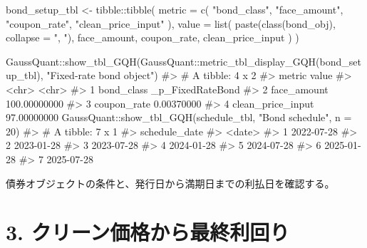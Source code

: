 \documentclass[
  letterpaper,
  DIV=11,
  numbers=noendperiod]{scrreprt}
\newenvironment{Shaded}{\begin{snugshade}}{\end{snugshade}}
\newcommand{\AttributeTok}[1]{\textcolor[rgb]{0.40,0.45,0.13}{#1}}
\newcommand{\CommentTok}[1]{\textcolor[rgb]{0.37,0.37,0.37}{#1}}
\newcommand{\DecValTok}[1]{\textcolor[rgb]{0.68,0.00,0.00}{#1}}
\newcommand{\FunctionTok}[1]{\textcolor[rgb]{0.28,0.35,0.67}{#1}}
\newcommand{\NormalTok}[1]{\textcolor[rgb]{0.00,0.23,0.31}{#1}}
\newcommand{\OtherTok}[1]{\textcolor[rgb]{0.00,0.23,0.31}{#1}}
\newcommand{\SpecialCharTok}[1]{\textcolor[rgb]{0.37,0.37,0.37}{#1}}
\newcommand{\StringTok}[1]{\textcolor[rgb]{0.13,0.47,0.30}{#1}}
\begin{document}
\begin{Shaded}
\begin{Highlighting}[]
\NormalTok{bond\_setup\_tbl }\OtherTok{\textless{}{-}}\NormalTok{ tibble}\SpecialCharTok{::}\FunctionTok{tibble}\NormalTok{(}
  \AttributeTok{metric =} \FunctionTok{c}\NormalTok{(}
    \StringTok{"bond\_class"}\NormalTok{,}
    \StringTok{"face\_amount"}\NormalTok{,}
    \StringTok{"coupon\_rate"}\NormalTok{,}
    \StringTok{"clean\_price\_input"}
\NormalTok{  ),}
  \AttributeTok{value =} \FunctionTok{list}\NormalTok{(}
    \FunctionTok{paste}\NormalTok{(}\FunctionTok{class}\NormalTok{(bond\_obj), }\AttributeTok{collapse =} \StringTok{", "}\NormalTok{),}
\NormalTok{    face\_amount,}
\NormalTok{    coupon\_rate,}
\NormalTok{    clean\_price\_input}
\NormalTok{  )}
\NormalTok{)}

\NormalTok{GaussQuant}\SpecialCharTok{::}\FunctionTok{show\_tbl\_GQH}\NormalTok{(GaussQuant}\SpecialCharTok{::}\FunctionTok{metric\_tbl\_display\_GQH}\NormalTok{(bond\_setup\_tbl), }\StringTok{"Fixed{-}rate bond object"}\NormalTok{)}
\CommentTok{\#\textgreater{} \# A tibble: 4 x 2}
\CommentTok{\#\textgreater{}   metric            value           }
\CommentTok{\#\textgreater{}   \textless{}chr\textgreater{}             \textless{}chr\textgreater{}           }
\CommentTok{\#\textgreater{} 1 bond\_class        \_p\_FixedRateBond}
\CommentTok{\#\textgreater{} 2 face\_amount       100.00000000    }
\CommentTok{\#\textgreater{} 3 coupon\_rate       0.00370000      }
\CommentTok{\#\textgreater{} 4 clean\_price\_input 97.00000000}
\NormalTok{GaussQuant}\SpecialCharTok{::}\FunctionTok{show\_tbl\_GQH}\NormalTok{(schedule\_tbl, }\StringTok{"Bond schedule"}\NormalTok{, }\AttributeTok{n =} \DecValTok{20}\NormalTok{)}
\CommentTok{\#\textgreater{} \# A tibble: 7 x 1}
\CommentTok{\#\textgreater{}   schedule\_date}
\CommentTok{\#\textgreater{}   \textless{}date\textgreater{}       }
\CommentTok{\#\textgreater{} 1 2022{-}07{-}28   }
\CommentTok{\#\textgreater{} 2 2023{-}01{-}28   }
\CommentTok{\#\textgreater{} 3 2023{-}07{-}28   }
\CommentTok{\#\textgreater{} 4 2024{-}01{-}28   }
\CommentTok{\#\textgreater{} 5 2024{-}07{-}28   }
\CommentTok{\#\textgreater{} 6 2025{-}01{-}28   }
\CommentTok{\#\textgreater{} 7 2025{-}07{-}28}
\end{Highlighting}
\end{Shaded}

債券オブジェクトの条件と、発行日から満期日までの利払日を確認する。

\section{3.
クリーン価格から最終利回り}\label{ux30afux30eaux30fcux30f3ux4fa1ux683cux304bux3089ux6700ux7d42ux5229ux56deux308a}
\end{document}

